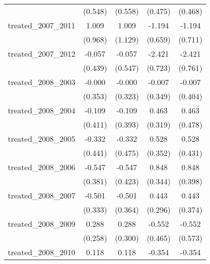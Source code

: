 {\begin{tabular}{l*{4}{c}}
            &     (0.548)         &     (0.558)         &     (0.475)         &     (0.468)         \\
[1em]
treated\_2007\_2011&       1.009         &       1.009         &      -1.194         &      -1.194         \\
            &     (0.968)         &     (1.129)         &     (0.659)         &     (0.711)         \\
[1em]
treated\_2007\_2012&      -0.057         &      -0.057         &      -2.421\sym{***}&      -2.421\sym{**} \\
            &     (0.439)         &     (0.547)         &     (0.723)         &     (0.761)         \\
[1em]
treated\_2008\_2003&      -0.000         &      -0.000         &      -0.007         &      -0.007         \\
            &     (0.353)         &     (0.323)         &     (0.349)         &     (0.404)         \\
[1em]
treated\_2008\_2004&      -0.109         &      -0.109         &       0.463         &       0.463         \\
            &     (0.411)         &     (0.393)         &     (0.319)         &     (0.478)         \\
[1em]
treated\_2008\_2005&      -0.332         &      -0.332         &       0.528         &       0.528         \\
            &     (0.441)         &     (0.475)         &     (0.352)         &     (0.431)         \\
[1em]
treated\_2008\_2006&      -0.547         &      -0.547         &       0.848\sym{*}  &       0.848\sym{*}  \\
            &     (0.381)         &     (0.423)         &     (0.344)         &     (0.398)         \\
[1em]
treated\_2008\_2007&      -0.501         &      -0.501         &       0.443         &       0.443         \\
            &     (0.333)         &     (0.364)         &     (0.296)         &     (0.374)         \\
[1em]
treated\_2008\_2009&       0.288         &       0.288         &      -0.552         &      -0.552         \\
            &     (0.258)         &     (0.300)         &     (0.465)         &     (0.573)         \\
[1em]
treated\_2008\_2010&       0.118         &       0.118         &      -0.354         &      -0.354         \\

\end{tabular}}
